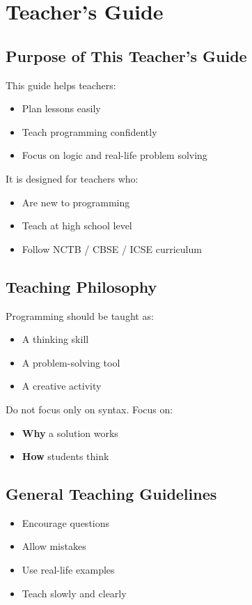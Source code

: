 
\chapter*{Teacher's Guide}

\section*{Purpose of This Teacher’s Guide}

This guide helps teachers:
\begin{itemize}
    \item Plan lessons easily
    \item Teach programming confidently
    \item Focus on logic and real-life problem solving
\end{itemize}

It is designed for teachers who:
\begin{itemize}
    \item Are new to programming
    \item Teach at high school level
    \item Follow NCTB / CBSE / ICSE curriculum
\end{itemize}

\section*{Teaching Philosophy}

Programming should be taught as:
\begin{itemize}
    \item A thinking skill
    \item A problem-solving tool
    \item A creative activity
\end{itemize}

Do not focus only on syntax.
Focus on:
\begin{itemize}
    \item \textbf{Why} a solution works
    \item \textbf{How} students think
\end{itemize}

\section*{General Teaching Guidelines}

\begin{itemize}
    \item Encourage questions
    \item Allow mistakes
    \item Use real-life examples
    \item Teach slowly and clearly
\end{itemize}

